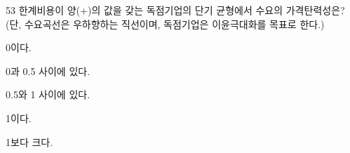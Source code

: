 \begin{question}{53}
한계비용이 양(+)의 값을 갖는 독점기업의 단기 균형에서 수요의 가격탄력성은? (단, 수요곡선은 우하향하는 직선이며, 독점기업은 이윤극대화를 목표로 한다.)
\begin{choices}
  \item 0이다.
  \item 0과 0.5 사이에 있다.
  \item 0.5와 1 사이에 있다.
  \item 1이다.
  \item 1보다 크다.
\end{choices}
\end{question}
